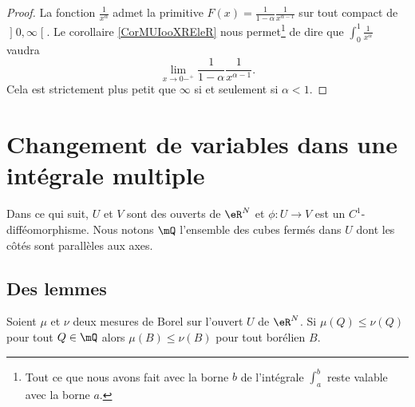 \begin{proof}
La fonction \( \frac{1}{ x^{\alpha} }\) admet la primitive \( F(x)=\frac{1}{ 1-\alpha }\frac{1}{ x^{\alpha-1} }\) sur tout compact de \( \mathopen] 0 , \infty \mathclose[\). Le corollaire \ref{CorMUIooXREleR} nous permet\footnote{Tout ce que nous avons fait avec la borne \( b\) de l'intégrale \( \int_a^b\) reste valable avec la borne \( a\).} de dire que \( \int_0^1\frac{1}{ x^{\alpha} }\) vaudra
    \begin{equation}
        \lim_{x\to 0-^+} \frac{1}{ 1-\alpha }\frac{1}{ x^{\alpha-1} }.
    \end{equation}
    Cela est strictement plus petit que \( \infty\) si et seulement si \( \alpha<1\).
\end{proof}

\section{Changement de variables dans une intégrale multiple}

Dans ce qui suit, \( U\) et \( V\) sont des ouverts de \( \eR^N\) et \( \phi\colon U\to V\) est un \( C^1\)-difféomorphisme. Nous notons \( \mQ\) l'ensemble des cubes fermés dans \( U\) dont les côtés sont parallèles aux axes.

\subsection{Des lemmes}

\begin{lemma}      \label{LemooJYCGooIkkDVn}
    Soient \( \mu\) et \( \nu\) deux mesures de Borel sur l'ouvert \( U\) de \( \eR^N\). Si \( \mu(Q)\leq \nu(Q)\) pour tout \( Q\in \mQ\) alors \( \mu(B)\leq \nu(B)\) pour tout borélien \( B\).
\end{lemma}


